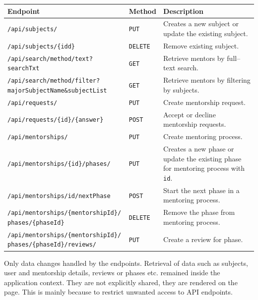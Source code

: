 \documentclass[10pt]{article}
\begin{document}
\begin{table}[h]
    \centering
    \begin{tabularx}{\textwidth}{|l|l|X|} \hline
        \textbf{Endpoint} & \textbf{Method} & \textbf{Description} \\ \hline
        \texttt{/api/subjects/} & \texttt{PUT} & Creates a new subject or update the existing subject.\\ \hline
        \texttt{/api/subjects/\{idd\}} & \texttt{DELETE} & Remove existing subject.\\ \hline
        \texttt{/api/search/method/text?searchTxt} & \texttt{GET} & Retrieve mentors by full--text search.\\ \hline
        \makecell[l]{\texttt{/api/search/method/filter?} \\ \quad\texttt{majorSubjectName\&subjectList}} & \texttt{GET} & Retrieve mentors by filtering by subjects.\\ \hline
        \texttt{/api/requests/} & \texttt{PUT} & Create mentorship request.\\ \hline
        \texttt{/api/requests/\{id\}/\{answer\}} & \texttt{POST} & Accept or decline mentorship requests.\\ \hline
        \texttt{/api/mentorships/} & \texttt{PUT} & Create mentoring process.\\ \hline
        \texttt{/api/mentorships/\{id\}/phases/} & \texttt{PUT} & Creates a new phase or update the existing phase for mentoring process with \texttt{id}.\\ \hline
        \texttt{/api/mentorships/{id}/nextPhase} & \texttt{POST} & Start the next phase in a mentoring process.\\ \hline
        \makecell[l]{\texttt{/api/mentorships/\{mentorshipId\}/} \\ \quad\texttt{phases/\{phaseId\}}} & \texttt{DELETE} & Remove the phase from mentoring process.\\ \hline
        \makecell[l]{\texttt{/api/mentorships/\{mentorshipId\}/} \\ \quad\texttt{phases/\{phaseId\}/reviews/}} & \texttt{PUT} & Create a review for phase.\\ \hline
    \end{tabularx}
    \label{tab:apis}
\end{table}

Only data changes handled by the endpoints. Retrieval of data such as subjects,
user and mentorship details, reviews or phases etc. remained inside the application context.
They are not explicitly shared, they are rendered on the page. This is mainly because to restrict
unwanted access to API endpoints.
\end{document}
